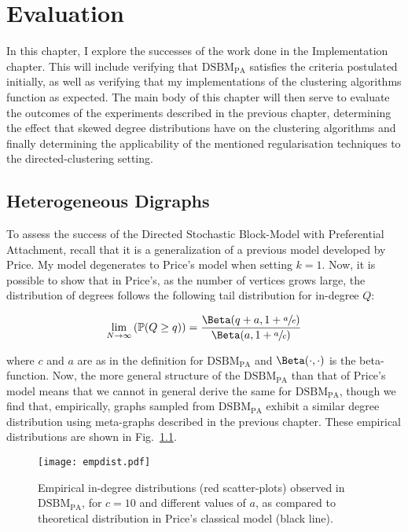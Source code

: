 \chapter{Evaluation}

In this chapter, I explore the successes of the work done in the Implementation chapter. This will 
include verifying that $\mathrm{DSBM}_\mathrm{PA}$ satisfies the criteria postulated 
initially, as well as verifying that my implementations of the clustering algorithms function as expected. The main body of this chapter will then serve to 
evaluate the outcomes of the experiments described in the previous chapter, determining the effect 
that skewed degree distributions have on the clustering algorithms and finally determining the applicability of the mentioned regularisation 
techniques to the directed-clustering setting.

\section{Heterogeneous Digraphs}

To assess the success of the Directed Stochastic Block-Model with Preferential Attachment, recall 
that it is a generalization of a previous model developed by Price. My model degenerates to Price's
 model when setting $k=1$. Now, it is possible %
to show that in Price's, as the number of vertices grows large, the distribution of degrees 
follows the following tail distribution for in-degree $Q$:

$$
\lim_{N \rightarrow \infty}\left(\mathbb P(Q \geq q)\right) = 
\frac{\Beta(q+a, 1+\sfrac ac)}{\Beta(a, 1 + \sfrac ac)}
$$ 

where $c$ and $a$ are as in the definition for $\mathrm{DSBM}_\mathrm{PA}$ and $\Beta(\cdot, \cdot)$ is the 
beta-function. Now, the more 
general structure of the $\mathrm{DSBM}_\mathrm{PA}$ than that of Price's model means that we 
cannot in general derive the same for $\mathrm{DSBM}_\mathrm{PA}$, though we find that, 
empirically, graphs sampled from $\mathrm{DSBM}_\mathrm{PA}$ exhibit a similar degree distribution 
using meta-graphs described in the previous chapter. These empirical distributions are shown in 
Fig.\ \ref{fig:empdist}.

\begin{figure}
\begin{center}
\texttt{[image: empdist.pdf]}
\end{center}
\caption{Empirical in-degree distributions (red scatter-plots) observed in 
$\mathrm{DSBM}_\mathrm{PA}$, for $c=10$ and different 
values of $a$, as compared to theoretical distribution in Price's classical model (black line).}
\label{fig:empdist}
\end{figure} 

